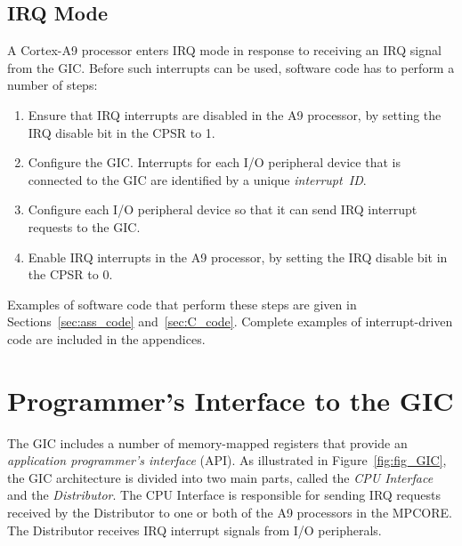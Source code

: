 \documentclass[11pt, twoside, pdftex]{article}
\begin{document}
\subsection{IRQ Mode}
A Cortex-A9 processor enters IRQ mode in response to receiving an IRQ signal from the GIC.
Before such interrupts can be used, software code has to perform a number of steps:

\begin{enumerate}
	\item Ensure that IRQ interrupts are disabled in the A9 processor, by setting 
			  the IRQ disable bit in the CPSR to 1.
	\item Configure the GIC. Interrupts for each I/O peripheral device that is connected to the GIC 
			  are identified by a unique {\it interrupt~ID}.
	\item Configure each I/O peripheral device so that it can send IRQ interrupt requests to the GIC.
	\item Enable IRQ interrupts in the A9 processor, by setting the IRQ disable bit in the
			  CPSR to 0.
\end{enumerate}

Examples of software code that perform these steps are given in
Sections~\ref{sec:ass_code} and~\ref{sec:C_code}. Complete examples of interrupt-driven
code are included in the appendices.

\section{Programmer's Interface to the GIC}
\label{sec:GIC} The GIC includes a number of memory-mapped registers that provide an
{\it application programmer's interface} (API). As illustrated in Figure~\ref{fig:fig_GIC}, the GIC
architecture is divided into two main parts, called the {\it CPU Interface} and the
{\it Distributor}.  The CPU Interface is responsible for sending IRQ requests received by 
the Distributor to one or both of the A9 processors in the MPCORE.
The Distributor receives IRQ interrupt signals from I/O peripherals.
\end{document}
